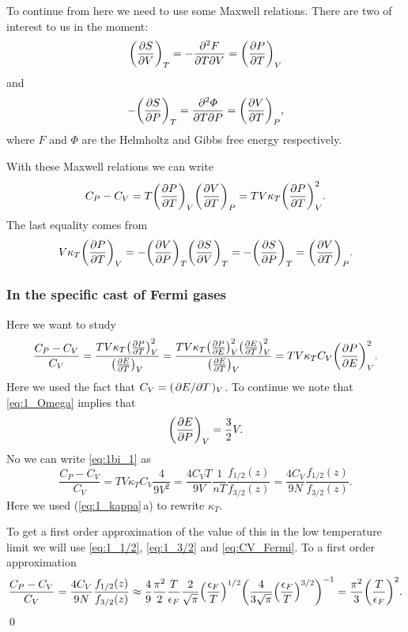 \documentclass[11pt,letter, swedish, english
]{article}
\begin{document}
To continue from here we need to use some Maxwell relations. There are
two of interest to us in the moment:
\begin{equation}
\qty(\pdv{S}{V})_T=-\pdv[2]{F}{T}{V}=\qty(\pdv{P}{T})_V
\end{equation}
and
\begin{equation}
-\qty(\pdv{S}{P})_T=\pdv[2]{\varPhi}{T}{P}=\qty(\pdv{V}{T})_P,
\end{equation}
where $F$ and $\varPhi$ are the Helmholtz and Gibbs free energy
respectively. 

With these Maxwell relations we can write
\begin{equation}
C_P-C_V=T\qty(\pdv{P}{T})_V\qty(\pdv{V}{T})_P
=TV\kappa_T\qty(\pdv{P}{T})_V^2.
\end{equation}
The last equality comes from
\begin{equation}
V\kappa_T\qty(\pdv{P}{T})_V=-\qty(\pdv{V}{P})_T\qty(\pdv{S}{V})_T
=-\qty(\pdv{S}{P})_T=\qty(\pdv{V}{T})_P.
\end{equation}

\subsubsection{In the specific cast of Fermi gases}
Here we want to study 
\begin{equation}\label{eq:1bi_1}
\frac{C_P-C_V}{C_V} 
= \frac{TV\kappa_T\qty(\pdv{P}{T})_V^2}{\qty(\pdv{E}{T})_V}
= \frac{TV\kappa_T\qty(\pdv{P}{E})_V^2\qty(\pdv{E}{T})_V^2}{\qty(\pdv{E}{T})_V}
= TV\kappa_TC_V\qty(\pdv{P}{E})_V^2.
\end{equation}
Here we used the fact that $C_V=(\pdv*{E}{T})_V$. To continue we
note that \eqref{eq:1_Omega} implies that
\begin{equation}
\qty(\pdv{E}{P})_V=\frac{3}{2}V.
\end{equation}
No we can write \eqref{eq:1bi_1} as
\begin{equation}
\frac{C_P-C_V}{C_V} 
= TV\kappa_TC_V\frac{4}{9V^2}
=\frac{4C_VT}{9V}\frac{1}{nT}\frac{f_{1/2}(z)}{f_{3/2}(z)}
=\frac{4C_V}{9N}\frac{f_{1/2}(z)}{f_{3/2}(z)}.
\end{equation}
Here we used (\ref{eq:1_kappa}\,a) to rewrite $\kappa_T$.

To get a first order approximation of the value of this in the low
temperature limit we will use \eqref{eq:1_1/2}, \eqref{eq:1_3/2} and
\eqref{eq:CV_Fermi}. To a first order approximation 
\begin{equation}
\frac{C_P-C_V}{C_V} =\frac{4C_V}{9N}\frac{f_{1/2}(z)}{f_{3/2}(z)} 
\approx \frac{4}{9} \frac{\pi^2}{2}\frac{T}{\epsilon_F}
\frac{2}{\sqrt{\pi}}\qty(\frac{\epsilon_F}{T})^{1/2}
\qty(\frac{4}{3\sqrt{\pi}}\qty(\frac{\epsilon_F}{T})^{3/2})^{-1}
=\frac{\pi^2}{3}\qty(\frac{T}{\epsilon_F})^2.
\end{equation}
\qed
\end{document}
